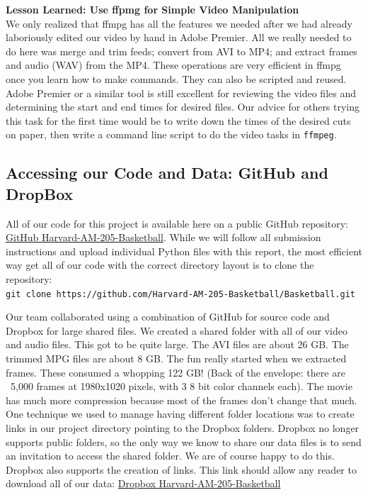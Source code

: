 \documentclass{article}
\begin{document}
\textbf{Lesson Learned: Use ffpmg for Simple Video Manipulation}\\
We only realized that ffmpg has all the features we needed after we had already laboriously
edited our video by hand in Adobe Premier.  
All we really needed to do here was merge and trim feeds; convert from AVI to MP4;
and extract frames and audio (WAV) from the MP4.
These operations are very efficient in ffmpg once you learn how to make commands.
They can also be scripted and reused.  
Adobe Premier or a similar tool is still excellent for reviewing the video files and determining
the start and end times for desired files.  
Our advice for others trying this task for the first time would be to write down the times of the
desired cuts on paper, then write a command line script to do the video tasks in \texttt{ffmpeg}.

\newpage
\subsection{Accessing our Code and Data: GitHub and DropBox}
All of our code for this project is available here on a public GitHub repository:\\
\href{https://github.com/Harvard-AM-205-Basketball/Basketball}{GitHub Harvard-AM-205-Basketball}.
While we will follow all submission instructions and upload individual Python files with this report,
the most efficient way get all of our code with the correct directory layout is to clone the repository: \\
\texttt{git clone https://github.com/Harvard-AM-205-Basketball/Basketball.git}

Our team collaborated using a combination of GitHub for source code and Dropbox for large shared files.
We created a shared folder with all of our video and audio files.  This got to be quite large.
The AVI files are about 26 GB.  The trimmed MPG files are about 8 GB.  
The fun really started when we extracted frames.  These consumed a whopping 122 GB!
(Back of the envelope: there are ~5,000 frames at 1980x1020 pixels, with 3 8 bit color channels each).
The movie has much more compression because most of the frames don't change that much.
One technique we used to manage having different folder locations was to create links in our
project directory pointing to the Dropbox folders.  
Dropbox no longer supports public folders, so the only way we know to share our data files
is to send an invitation to access the shared folder.  We are of course happy to do this.
Dropbox also supports the creation of links.  This link should allow any reader to download all of our data:
\href{https://www.dropbox.com/sh/kdvbl0sfw9lckff/AABTEYhBnZ7FPw6Ku5Bznjkea?dl=0}{Dropbox Harvard-AM-205-Basketball}
\end{document}
